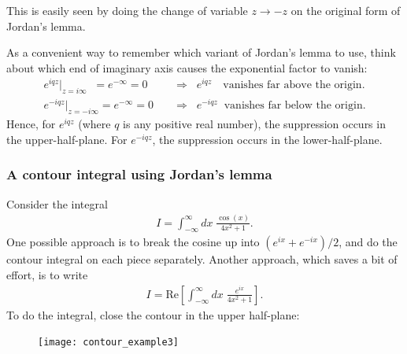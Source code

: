 \documentclass[10pt,a4paper]{article}
\begin{document}
\noindent
This is easily seen by doing the change of variable $z \rightarrow -z$
on the original form of Jordan's lemma.

As a convenient way to remember which variant of Jordan's lemma to
use, think about which end of imaginary axis causes the exponential
factor to vanish:
\begin{align}
  e^{iqz}\big|_{z = i\infty}\;\; = e^{-\infty} = 0\quad &\Rightarrow \;\; e^{iqz} \;\;\;\,\text{vanishes far above the origin}. \\
  e^{-iqz}\big|_{z = -i\infty} = e^{-\infty} = 0\quad &\Rightarrow \;\; e^{-iqz} \;\;\textrm{vanishes far below the origin}.
\end{align}
Hence, for $e^{iqz}$ (where $q$ is any positive real number), the
suppression occurs in the upper-half-plane. For $e^{-iqz}$, the
suppression occurs in the lower-half-plane.

\subsubsection{A contour integral using Jordan's lemma}
\label{a-contour-integral-using-jordans-lemma}

Consider the integral
\begin{align}
  I = \int_{-\infty}^\infty dx\; \frac{\cos(x)}{4x^2 + 1}.
\end{align}
One possible approach is to break the cosine up into $(e^{ix} +
e^{-ix})/2$, and do the contour integral on each piece separately.
Another approach, which saves a bit of effort, is to write
\begin{align}
  I = \mathrm{Re} \left[ \int_{-\infty}^\infty dx\; \frac{e^{ix}}{4x^2 + 1}\right].
\end{align}
To do the integral, close the contour in the upper half-plane:

\begin{figure}[ht]
  \centering\texttt{[image: contour\_example3]}
\end{figure}
\end{document}
